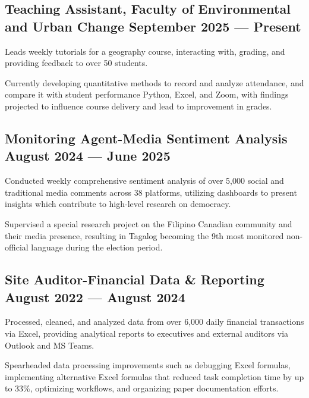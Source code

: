

\subsection{{Teaching Assistant, Faculty of Environmental and Urban Change \hfill September 2025 --- Present}}
\begin{zitemize}
\item Leads weekly tutorials for a geography course, interacting with, grading, and providing feedback to over 50 students.
\item Currently developing quantitative methods to record and analyze attendance, and compare it with student performance Python, Excel, and Zoom, with findings projected to influence course delivery and lead to improvement in grades.
\end{zitemize}

\subsection{{Monitoring Agent-Media Sentiment Analysis \hfill August 2024 --- June 2025}}
\begin{zitemize}
\item Conducted weekly comprehensive sentiment analysis of over 5,000 social and traditional media comments across
38 platforms, utilizing dashboards to present insights which contribute to high-level research on democracy.
\item Supervised a special research project on the Filipino Canadian community and their media presence, resulting
in Tagalog becoming the 9th most monitored non-official language during the election period.
\end{zitemize}

\subsection{{Site Auditor-Financial Data \& Reporting \hfill August 2022 --- August 2024}}
\begin{zitemize}
\item Processed, cleaned, and analyzed data from over 6,000 daily financial transactions via Excel, providing analytical
reports to executives and external auditors via Outlook and MS Teams.
\item Spearheaded data processing improvements such as debugging  Excel formulas, implementing alternative Excel formulas that reduced task completion time by
up to 33\%, optimizing workflows, and organizing paper documentation efforts.
\end{zitemize}

